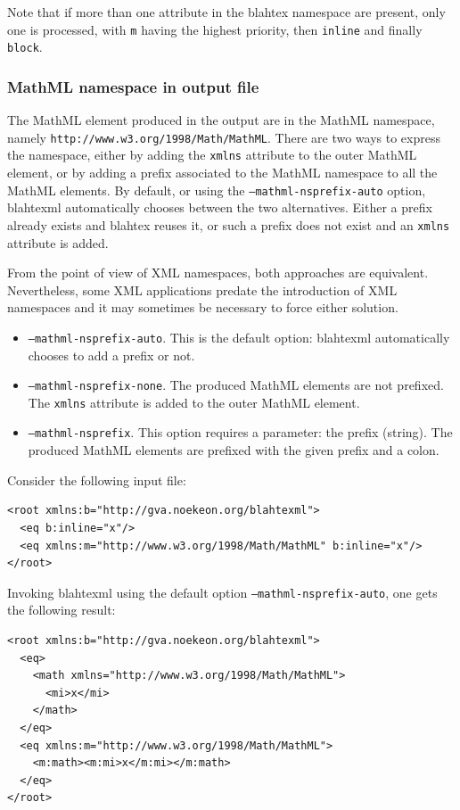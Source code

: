 \documentclass{article}
\begin{document}
Note that if more than one attribute in the blahtex namespace are present, only one is processed, with \texttt{m} having the highest priority, then \texttt{inline} and finally \texttt{block}.

\subsubsection{MathML namespace in output file}

The MathML element produced in the output are in the MathML namespace, namely \texttt{http://www.w3.org/1998/Math/MathML}. There are two ways to express the namespace, either by adding the \texttt{xmlns} attribute to the outer MathML element, or by adding a prefix associated to the MathML namespace to all the MathML elements. By default, or using the \texttt{--mathml-nsprefix-auto} option, blahtexml automatically chooses between the two alternatives. Either a prefix already exists and blahtex reuses it, or such a prefix does not exist and an \texttt{xmlns} attribute is added.

From the point of view of XML namespaces, both approaches are equivalent. Nevertheless, some XML applications predate the introduction of XML namespaces and it may sometimes be necessary to force either solution.

\begin{itemize}
\item \texttt{--mathml-nsprefix-auto}. This is the default option: blahtexml automatically chooses to add a prefix or not.
\item \texttt{--mathml-nsprefix-none}. The produced MathML elements are not prefixed. The \texttt{xmlns} attribute is added to the outer MathML element.
\item \texttt{--mathml-nsprefix}. This option requires a parameter: the prefix (string). The produced MathML elements are prefixed with the given prefix and a colon.
\end{itemize}

Consider the following input file:
\begin{verbatim}
<root xmlns:b="http://gva.noekeon.org/blahtexml">
  <eq b:inline="x"/>
  <eq xmlns:m="http://www.w3.org/1998/Math/MathML" b:inline="x"/>
</root>
\end{verbatim}

Invoking blahtexml using the default option \texttt{--mathml-nsprefix-auto}, one gets the following result:
\begin{verbatim}
<root xmlns:b="http://gva.noekeon.org/blahtexml">
  <eq>
    <math xmlns="http://www.w3.org/1998/Math/MathML">
      <mi>x</mi>
    </math>
  </eq>
  <eq xmlns:m="http://www.w3.org/1998/Math/MathML">
    <m:math><m:mi>x</m:mi></m:math>
  </eq>
</root>
\end{verbatim}
\end{document}
